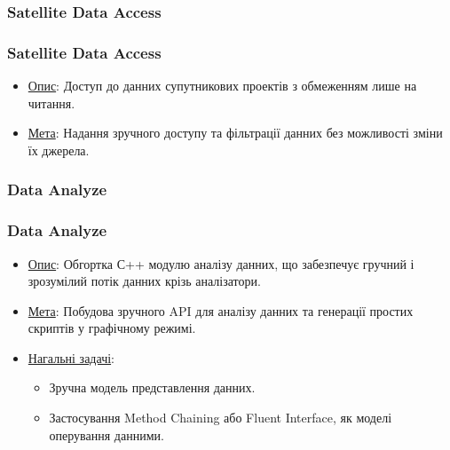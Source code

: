 \documentclass[final,12pt,aspectratio=43]{beamer}
\begin{document}
\subsubsection{Satellite Data Access}
\begin{frame}
    \frametitle{Satellite Data Access}
    \begin{itemize}
        \item \colorbox{light-blue}{\underline{Опис}:} Доступ до данних супутникових проектів з обмеженням лише на читання.
        \item \colorbox{light-blue}{\underline{Мета}:} Надання зручного доступу та фільтрації данних без можливості зміни їх джерела.
    \end{itemize}
\end{frame}

\subsubsection{Data  Analyze}
\begin{frame}
    \frametitle{Data  Analyze}
    \begin{itemize}
        \item \colorbox{light-blue}{\underline{Опис}:} Обгортка С++ модулю аналізу данних, що забезпечує гручний і зрозумілий потік данних крізь аналізатори.
        \item \colorbox{light-blue}{\underline{Мета}:} Побудова зручного API для аналізу данних та генерації простих скриптів у графічному режимі.
        \item \colorbox{light-blue}{\underline{Нагальні задачі}:} 
        \begin{itemize}
            \item Зручна модель представлення данних.
            \item Застосування Method Chaining або Fluent Interface, як моделі оперування данними.
        \end{itemize}
    \end{itemize}
\end{frame}

\end{document}
